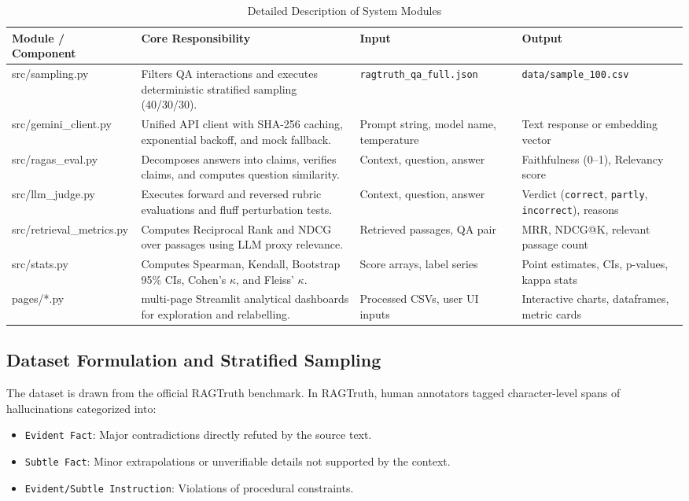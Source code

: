 \documentclass[11pt,a4paper]{article}
\renewcommand{\arraystretch}{1.2}
\begin{document}
\begin{table}[htbp]
\centering
\caption{Detailed Description of System Modules}
\label{tab:modules}
\footnotesize
\renewcommand{\arraystretch}{1.25}
\begin{tabularx}{\linewidth}{|>{\RaggedRight\ttfamily\footnotesize}p{3.3cm}|>{\RaggedRight}X|>{\RaggedRight\footnotesize}p{3.0cm}|>{\RaggedRight\footnotesize}p{2.8cm}|}
\hline
\rowcolor{tableheader}
\textbf{\textnormal{Module / Component}} & \textbf{\textnormal{Core Responsibility}} & \textbf{\textnormal{Input}} & \textbf{\textnormal{Output}} \\
\hline
src/sampling.py & Filters QA interactions and executes deterministic stratified sampling (40/30/30). & \texttt{ragtruth\_}\allowbreak\texttt{qa\_full.json} & \texttt{data/sample\_}\allowbreak\texttt{100.csv} \\
\hline
src/gemini\_\allowbreak client.py & Unified API client with SHA-256 caching, exponential backoff, and mock fallback. & Prompt string, model name, temperature & Text response or embedding vector \\
\hline
src/ragas\_\allowbreak eval.py & Decomposes answers into claims, verifies claims, and computes question similarity. & Context, question, answer & Faithfulness (0--1), Relevancy score \\
\hline
src/llm\_\allowbreak judge.py & Executes forward and reversed rubric evaluations and fluff perturbation tests. & Context, question, answer & Verdict (\texttt{correct}, \texttt{partly}, \texttt{incorrect}), reasons \\
\hline
src/retrieval\_\allowbreak metrics.py & Computes Reciprocal Rank and NDCG over passages using LLM proxy relevance. & Retrieved passages, QA pair & MRR, NDCG@K, relevant passage count \\
\hline
src/stats.py & Computes Spearman, Kendall, Bootstrap 95\% CIs, Cohen's $\kappa$, and Fleiss' $\kappa$. & Score arrays, label series & Point estimates, CIs, p-values, kappa stats \\
\hline
pages/*.py & 7 multi-page Streamlit analytical dashboards for exploration and relabelling. & Processed CSVs, user UI inputs & Interactive charts, dataframes, metric cards \\
\hline
\end{tabularx}
\end{table}

\subsection{Dataset Formulation and Stratified Sampling}
The dataset is drawn from the official RAGTruth benchmark. In RAGTruth, human annotators tagged character-level spans of hallucinations categorized into:
\begin{itemize}[leftmargin=*]
    \item \texttt{Evident Fact}: Major contradictions directly refuted by the source text.
    \item \texttt{Subtle Fact}: Minor extrapolations or unverifiable details not supported by the context.
    \item \texttt{Evident/Subtle Instruction}: Violations of procedural constraints.
\end{itemize}
\end{document}
